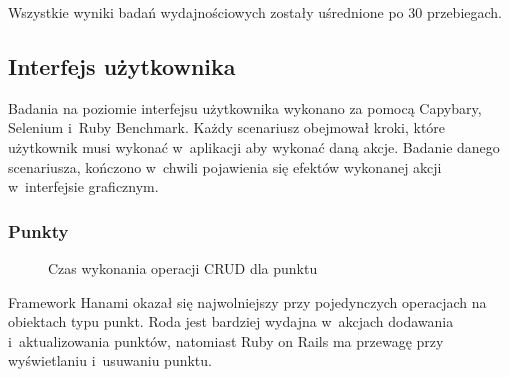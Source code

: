 \documentclass[printmode]{mgr}
\begin{document}
Wszystkie wyniki badań wydajnościowych zostały uśrednione po 30 przebiegach.

\subsection{Interfejs użytkownika}

Badania na poziomie interfejsu użytkownika wykonano za pomocą Capybary, Selenium i~Ruby Benchmark. Każdy scenariusz obejmował kroki, które użytkownik musi wykonać w~aplikacji aby wykonać daną akcje. Badanie danego scenariusza, kończono w~chwili pojawienia się efektów wykonanej akcji w~interfejsie graficznym.

\subsubsection{Punkty}

\begin{figure}[H]
  \centering
  \caption{Czas wykonania operacji CRUD dla punktu}
  \label{fig:crud_points}
\end{figure}

Framework Hanami okazał się najwolniejszy przy pojedynczych operacjach na obiektach typu punkt. Roda jest bardziej wydajna w~akcjach dodawania i~aktualizowania punktów, natomiast Ruby on Rails ma przewagę przy wyświetlaniu i~usuwaniu punktu.
\end{document}
